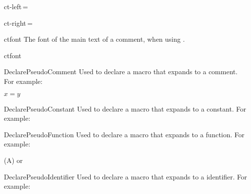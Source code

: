 \documentclass[a4paper]{article}
\def\refc{\refCom*}
\begin{document}
\begin{docKey}{ct-left}{\,=\,}{\initialkeyvalue{\code{(}}}
\end{docKey}
\begin{docKey}{ct-right}{\,=\,}{\initialkeyvalue{\code{)}}}
\end{docKey}
\begin{docKey}{ctfont}{}{}
    The font of the main text of a comment, when using \refc{ct}.
\end{docKey}
\begin{docCommand}{ctfont}{}
\end{docCommand}

\begin{docCommand}{DeclarePseudoComment}{}
    Used to declare a macro that expands to a comment. For example:
\begin{texexp}
\DeclarePseudoComment {}
$x = y$ \qquad \Imp
\end{texexp}
\end{docCommand}

\begin{docCommand}{DeclarePseudoConstant}{}
    Used to declare a macro that expands to a constant. For example:
\begin{texexp}
\DeclarePseudoConstant {}
\False
\end{texexp}
\end{docCommand}

\begin{docCommand}{DeclarePseudoFunction}{}
    Used to declare a macro that expands to a function. For example:
\begin{texexp}
\DeclarePseudoFunction {}
\Ln(A) or \Ln[A]
\end{texexp}
\end{docCommand}

\begin{docCommand}{DeclarePseudoIdentifier}{}
    Used to declare a macro that expands to a identifier. For example:
\begin{texexp}
\DeclarePseudoIdentifier {}
\Rank
\end{texexp}
\end{docCommand}
\end{document}
